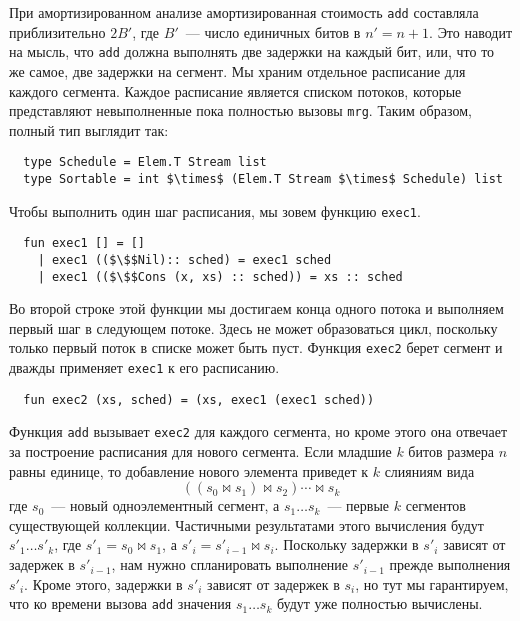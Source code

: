 При амортизированном анализе амортизированная стоимость
\lstinline!add! составляла приблизительно $2B'$, где $B'$~--- число
единичных битов в $n' = n + 1$. Это наводит на мысль, что
\lstinline!add! должна выполнять две задержки на каждый бит, или, что
то же самое, две задержки на сегмент. Мы храним отдельное расписание
для каждого сегмента. Каждое расписание является списком
потоков, которые представляют невыполненные пока полностью вызовы
\lstinline!mrg!. Таким образом, полный тип выглядит так:
\begin{lstlisting}
  type Schedule = Elem.T Stream list
  type Sortable = int $\times$ (Elem.T Stream $\times$ Schedule) list
\end{lstlisting}
Чтобы выполнить один шаг расписания, мы зовем функцию
\lstinline!exec1!.
\begin{lstlisting}
  fun exec1 [] = []
    | exec1 (($\$$Nil):: sched) = exec1 sched
    | exec1 (($\$$Cons (x, xs) :: sched)) = xs :: sched
\end{lstlisting}
Во второй строке этой функции мы достигаем конца одного потока и
выполняем первый шаг в следующем потоке. Здесь не может образоваться
цикл, поскольку только первый поток в списке может быть пуст. Функция
\lstinline!exec2! берет сегмент и дважды применяет \lstinline!exec1!
к его расписанию.
\begin{lstlisting}
  fun exec2 (xs, sched) = (xs, exec1 (exec1 sched))
\end{lstlisting}
Функция \lstinline!add! вызывает \lstinline!exec2! для каждого
сегмента, но кроме этого она отвечает за построение расписания для
нового сегмента. Если младшие $k$ битов размера $n$ равны единице, то
добавление нового элемента приведет к $k$ слияниям вида
$$
((s_0 \bowtie s_1) \bowtie s_2) \cdots \bowtie s_k
$$
где $s_0$~--- новый одноэлементный сегмент, а $s_1 \ldots s_k$~---
первые $k$ сегментов существующей коллекции. Частичными результатами
этого вычисления будут $s'_1 \ldots s'_k$, где $s'_1 = s_0 \bowtie
s_1$, а $s'_i = s'_{i-1} \bowtie s_i$. Поскольку задержки в $s'_i$
зависят от задержек в $s'_{i-1}$, нам нужно спланировать выполнение
$s'_{i-1}$ прежде выполнения $s'_i$.  Кроме этого, задержки в $s'_i$
зависят от задержек в $s_i$, но тут мы гарантируем, что ко времени
вызова \lstinline!add! значения $s_1 \ldots s_k$ будут уже полностью
вычислены.

